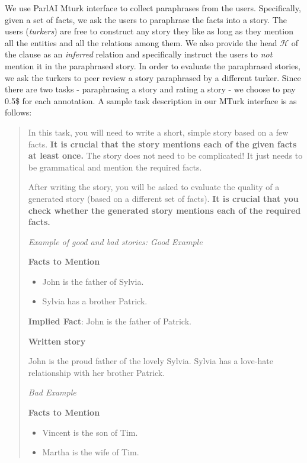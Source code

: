 \documentclass[letterpaper, 12pt]{report}
\begin{document}
We use ParlAI \citep{miller2017parlai} Mturk interface to collect paraphrases from the users. Specifically, given a set of facts, we ask the users to paraphrase the facts into a story. The users (\textit{turkers}) are free to construct any story they like as long as they mention all the entities and all the relations among them. We also provide the head $\mathcal{H}$ of the clause as an \textit{inferred} relation and specifically instruct the users to \textit{not} mention it in the paraphrased story. In order to evaluate the paraphrased stories, we ask the turkers to peer review a story paraphrased by a different turker. Since there are two tasks - paraphrasing a story and rating a story - we choose to pay 0.5\$ for each annotation. A sample task description in our MTurk interface is as follows:

\begin{quote}\small
    In this task, you will need to write a short, simple story based on a few facts. \textbf{It is crucial that the story mentions each of the given facts at least once.} The story does not need to be complicated! It just needs to be grammatical and mention the required facts.

    After writing the story, you will be asked to evaluate the quality of a generated story (based on a different set of facts). \textbf{It is crucial that you check whether the generated story mentions each of the required facts.}

    \textit{Example of good and bad stories: Good Example}

    \textbf{Facts to Mention}
    \begin{itemize}
        \item John is the father of Sylvia.
        \item Sylvia has a brother Patrick.
    \end{itemize}

    \textbf{Implied Fact}: John is the father of Patrick.

    \textbf{Written story}

    John is the proud father of the lovely Sylvia. Sylvia has a love-hate relationship with her brother Patrick.

    \textit{Bad Example}

    \textbf{Facts to Mention}

    \begin{itemize}
        \item Vincent is the son of Tim.
        \item Martha is the wife of Tim.
    \end{itemize}


\end{quote}
\end{document}
